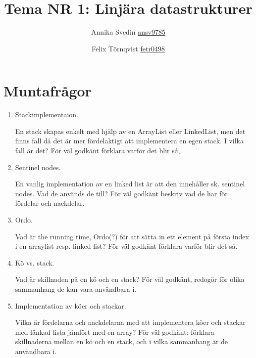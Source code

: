 \documentclass[a5paper,10pt,oneside]{article}
\title{Tema NR 1: Linjära datastrukturer}
\author{Annika Svedin \url{ansv9785} \and Felix Törnqvist \url{fetr0498}}
\begin{document}
\maketitle

\section*{Muntafrågor}

\begin{enumerate}

\item Stackimplementaion.

En stack skapas enkelt med hjälp av en ArrayList eller LinkedList, men det finns fall då det är mer fördelaktigt att implementera en egen stack. I vilka fall är det?
För väl godkänt förklara varför det blir så,

\item Sentinel nodes.

En vanlig implementation av en linked list är att den innehåller sk. sentinel nodes. Vad de används de till? 
För väl godkänt beskriv vad de har för fördelar och nackdelar.

\item Ordo.

Vad är the running time, Ordo(?) för att sätta in ett element på första index i en arraylist resp. linked list? 
För väl godkänt förklara varför blir det så.

\item Kö vs. stack.

Vad är skillnaden på en kö och en stack? För väl godkänt, redogör för olika sammanhang de kan vara användbara i.

\item Implementation av köer och stackar.

Vilka är fördelarna och nackdelarna med att implementera köer och stackar med länkad lista jämfört med en array?
För väl godkänt: förklara skillnaderna mellan en kö och en stack, och i vilka sammanhang är de användbara i.


\end{enumerate}
\end{document}
